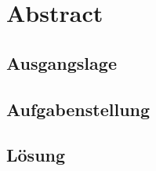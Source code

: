 \section*{\huge Abstract}
\vspace{0.5cm}
\subsection*{Ausgangslage}
\vspace{0.2cm}

\vspace{0.5cm}
\subsection*{Aufgabenstellung}
\vspace{0.2cm}
\vspace{0.5cm}
\subsection*{Lösung}
\vspace{0.2cm}
